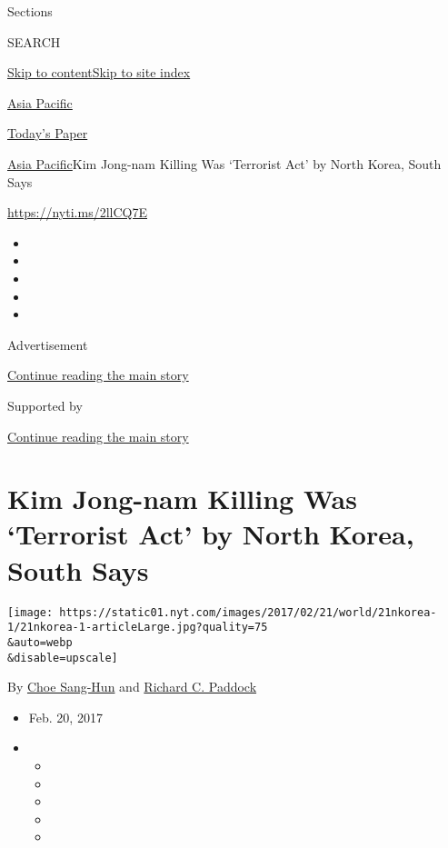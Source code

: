 Sections

SEARCH

\protect\hyperlink{site-content}{Skip to
content}\protect\hyperlink{site-index}{Skip to site index}

\href{https://www.nytimes.com/section/world/asia}{Asia Pacific}

\href{https://myaccount.nytimes.com/auth/login?response_type=cookie\&client_id=vi}{}

\href{https://www.nytimes.com/section/todayspaper}{Today's Paper}

\href{/section/world/asia}{Asia Pacific}\textbar{}Kim Jong-nam Killing
Was `Terrorist Act' by North Korea, South Says

\url{https://nyti.ms/2llCQ7E}

\begin{itemize}
\item
\item
\item
\item
\item
\end{itemize}

Advertisement

\protect\hyperlink{after-top}{Continue reading the main story}

Supported by

\protect\hyperlink{after-sponsor}{Continue reading the main story}

\hypertarget{kim-jong-nam-killing-was-terrorist-act-by-north-korea-south-says}{%
\section{Kim Jong-nam Killing Was `Terrorist Act' by North Korea, South
Says}\label{kim-jong-nam-killing-was-terrorist-act-by-north-korea-south-says}}

\texttt{[image: https://static01.nyt.com/images/2017/02/21/world/21nkorea-1/21nkorea-1-articleLarge.jpg?quality=75\\\&auto=webp\\\&disable=upscale]}

By \href{http://www.nytimes.com/by/choe-sang-hun}{Choe Sang-Hun} and
\href{https://www.nytimes.com/by/richard-c-paddock}{Richard C. Paddock}

\begin{itemize}
\item
  Feb. 20, 2017
\item
  \begin{itemize}
  \item
  \item
  \item
  \item
  \item
  \end{itemize}
\end{itemize}

